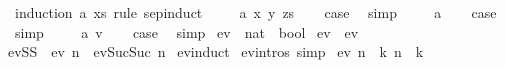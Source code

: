 \begin{isabellebody}
%
\isatagproof
{}\isamarkupfalse%
\ {\isacharparenleft}{\kern0pt}induction\ a\ xs\ rule{\isacharcolon}{\kern0pt}\ sep{\isachardot}{\kern0pt}induct{\isacharparenright}{\kern0pt}\isanewline
{}\isamarkupfalse%
\isanewline
\ \ \isamarkupfalse%
\ {\isacharparenleft}{\kern0pt}{}\ a\ x\ y\ zs{\isacharparenright}{\kern0pt}\isanewline
\ \ \isamarkupfalse%
\ {\isacharquery}{\kern0pt}case\ \isamarkupfalse%
\ simp\isanewline
{}\isamarkupfalse%
\isanewline
\ \ \isamarkupfalse%
\ {\isacharparenleft}{\kern0pt}{\isachardoublequoteopen}{}{\isacharunderscore}{\kern0pt}{}{\isachardoublequoteclose}\ a{\isacharparenright}{\kern0pt}\isanewline
\ \ \isamarkupfalse%
\ {\isacharquery}{\kern0pt}case\ \isamarkupfalse%
\ simp\isanewline
{}\isamarkupfalse%
\isanewline
\ \ \isamarkupfalse%
\ {\isacharparenleft}{\kern0pt}{\isachardoublequoteopen}{}{\isacharunderscore}{\kern0pt}{}{\isachardoublequoteclose}\ a\ v{\isacharparenright}{\kern0pt}\isanewline
\ \ \isamarkupfalse%
\ {\isacharquery}{\kern0pt}case\ \isamarkupfalse%
\ simp\isanewline
{}\isamarkupfalse%
%
\endisatagproof
{\isafoldproof}%
%
\isadelimproof
%
\endisadelimproof
%
\isadelimdocument
%
\endisadelimdocument
%
\isatagdocument
%
\isamarkuptrue%
%
\endisatagdocument
{\isafolddocument}%
%
\isadelimdocument
%
\endisadelimdocument
{}\isamarkupfalse%
\ ev\ {\isacharcolon}{\kern0pt}{\isacharcolon}{\kern0pt}\ {\isachardoublequoteopen}nat\ {\isacharequal}{\kern0pt}{\isachargreater}{\kern0pt}\ bool{\isachardoublequoteclose}\ \isanewline
ev{}{\isacharcolon}{\kern0pt}\ \ {\isachardoublequoteopen}ev\ {}{\isachardoublequoteclose}\ {\isacharbar}{\kern0pt}\isanewline
evSS{\isacharcolon}{\kern0pt}\ \ {\isachardoublequoteopen}ev\ n\ {\isasymLongrightarrow}\ ev{\isacharparenleft}{\kern0pt}Suc{\isacharparenleft}{\kern0pt}Suc\ n{\isacharparenright}{\kern0pt}{\isacharparenright}{\kern0pt}{\isachardoublequoteclose}\isanewline
\isanewline
{}\isamarkupfalse%
\ ev{\isachardot}{\kern0pt}induct\isanewline
\isanewline
{}\isamarkupfalse%
\ ev{\isachardot}{\kern0pt}intros\ {\isacharbrackleft}{\kern0pt}simp{\isacharbrackright}{\kern0pt}\isanewline
\isanewline
\isanewline
{}\isamarkupfalse%
\ {\isachardoublequoteopen}ev\ n\ {\isasymLongrightarrow}\ {\isasymexists}k{\isachardot}{\kern0pt}\ n\ {\isacharequal}{\kern0pt}\ {}{\isacharasterisk}{\kern0pt}k{\isachardoublequoteclose}\isanewline

\end{isabellebody}

